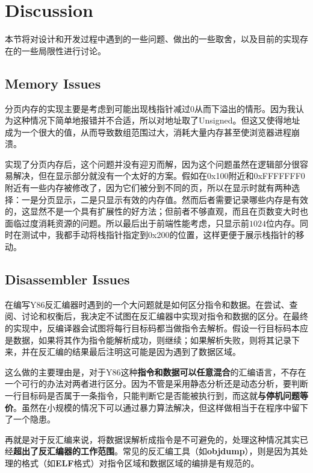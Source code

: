 
\section{Discussion}

本节将对设计和开发过程中遇到的一些问题、做出的一些取舍，以及目前的实现存在的一些局限性进行讨论。

\subsection{Memory Issues}

分页内存的实现主要是考虑到可能出现栈指针减过$0$从而下溢出的情形。因为我认为这种情况下简单地报错并不合适，所以对地址取了Unsigned。但这又使得地址成为一个很大的值，从而导致数组范围过大，消耗大量内存甚至使浏览器进程崩溃。

实现了分页内存后，这个问题并没有迎刃而解，因为这个问题虽然在逻辑部分很容易解决，但在显示部分就没有一个太好的方案。假如在0x100附近和0xFFFFFFF0附近有一些内存被修改了，因为它们被分到不同的页，所以在显示时就有两种选择：一是分页显示，二是只显示有效的内存值。然而后者需要记录哪些内存是有效的，这显然不是一个具有扩展性的好方法；但前者不够直观，而且在页数变大时也面临过度消耗资源的问题。所以最后出于前端性能考虑，只显示前$1024$位内存。同时在测试中，我都手动将栈指针指定到0x200的位置，这样更便于展示栈指针的移动。

\subsection{Disassembler Issues}

在编写Y86反汇编器时遇到的一个大问题就是如何区分指令和数据。在尝试、查阅、讨论和权衡后，我决定不试图在反汇编器中实现对指令和数据的区分。在最终的实现中，反编译器会试图将每行目标码都当做指令去解析。假设一行目标码本应是数据，如果将其作为指令能解析成功，则继续；如果解析失败，则将其记录下来，并在反汇编的结果最后注明这可能是因为遇到了数据区域。

这么做的主要理由是，对于Y86这种{\bf 指令和数据可以任意混合}的汇编语言，不存在一个可行的办法对两者进行区分。因为不管是采用静态分析还是动态分析，要判断一行目标码是否属于一条指令，只能判断它是否能被执行到，而这就{\bf 与停机问题等价}。虽然在小规模的情况下可以通过暴力算法解决，但这样做相当于在程序中留下了一个隐患。

再就是对于反汇编来说，将数据误解析成指令是不可避免的，处理这种情况其实已经{\bf 超出了反汇编器的工作范围}。常见的反汇编工具（如{\bf objdump}），则是因为其处理的格式（如{\bf ELF}格式）对指令区域和数据区域的编排是有规范的。

